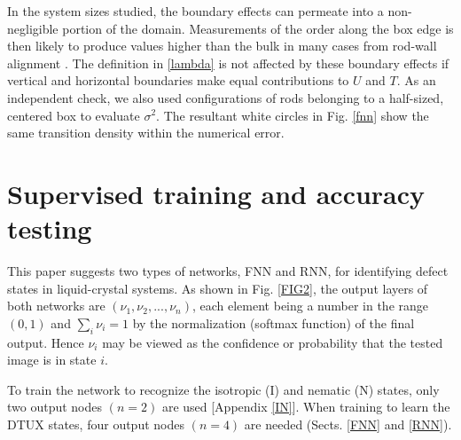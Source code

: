 In the system sizes studied, the boundary effects can permeate into a non-negligible portion of the domain. Measurements of the order along the box edge is then likely to produce values higher than the bulk in many cases from rod-wall alignment \cite{wallordering,ChenCui1995,Chen2007}.
The definition in \eqref{lambda} is not affected by these boundary effects if vertical and horizontal boundaries make equal contributions to $U$ and $T$. As an independent check, we also used configurations of rods belonging to a half-sized, centered box to evaluate $\sigma^2$. The resultant white circles in Fig. \ref{fnn} show the same transition density within the numerical error.



\section{Supervised training and accuracy testing}\label{Supervise}

This paper  suggests two types of networks, FNN and RNN, for identifying defect states in liquid-crystal systems. As shown in Fig. \ref{FIG2}, the output layers of both networks are $(\nu_1, \nu_2, ..., \nu_n)$, each element being a number in the range $(0,1)$ and $\sum_i \nu_i = 1$ by the normalization (softmax function) of the final output.
Hence $\nu_i$ may be viewed as the confidence or probability that
the tested image is in state $i$.

To train the network to recognize the isotropic (I) and nematic (N) states, only two output nodes $(n=2)$ are used [Appendix \ref{IN}]. When training to learn the DTUX states, four output nodes $(n=4)$ are needed (Sects. \ref{FNN} and \ref{RNN}).

